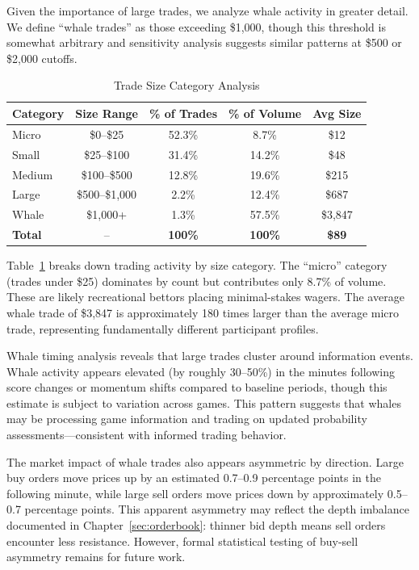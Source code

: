Given the importance of large trades, we analyze whale activity in greater detail. We define ``whale trades'' as those exceeding \$1,000, though this threshold is somewhat arbitrary and sensitivity analysis suggests similar patterns at \$500 or \$2,000 cutoffs.

\begin{table}[H]
\centering
\caption{Trade Size Category Analysis}
\label{tab:trade-categories}
\begin{tabular}{lcccc}
\toprule
\textbf{Category} & \textbf{Size Range} & \textbf{\% of Trades} & \textbf{\% of Volume} & \textbf{Avg Size} \\
\midrule
Micro & \$0--\$25 & 52.3\% & 8.7\% & \$12 \\
Small & \$25--\$100 & 31.4\% & 14.2\% & \$48 \\
Medium & \$100--\$500 & 12.8\% & 19.6\% & \$215 \\
Large & \$500--\$1,000 & 2.2\% & 12.4\% & \$687 \\
Whale & \$1,000+ & 1.3\% & 57.5\% & \$3,847 \\
\midrule
\textbf{Total} & -- & \textbf{100\%} & \textbf{100\%} & \textbf{\$89} \\
\bottomrule
\end{tabular}
\end{table}

Table~\ref{tab:trade-categories} breaks down trading activity by size category. The ``micro'' category (trades under \$25) dominates by count but contributes only 8.7\% of volume. These are likely recreational bettors placing minimal-stakes wagers. The average whale trade of \$3,847 is approximately 180 times larger than the average micro trade, representing fundamentally different participant profiles.

Whale timing analysis reveals that large trades cluster around information events. Whale activity appears elevated (by roughly 30--50\%) in the minutes following score changes or momentum shifts compared to baseline periods, though this estimate is subject to variation across games. This pattern suggests that whales may be processing game information and trading on updated probability assessments---consistent with informed trading behavior.

The market impact of whale trades also appears asymmetric by direction. Large buy orders move prices up by an estimated 0.7--0.9 percentage points in the following minute, while large sell orders move prices down by approximately 0.5--0.7 percentage points. This apparent asymmetry may reflect the depth imbalance documented in Chapter~\ref{sec:orderbook}: thinner bid depth means sell orders encounter less resistance. However, formal statistical testing of buy-sell asymmetry remains for future work.

